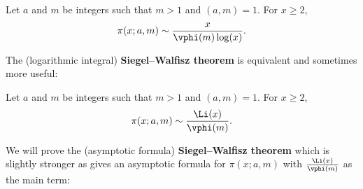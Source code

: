     \begin{theorem*}
      Let \(a\) and \(m\) be integers such that \(m > 1\) and \((a,m) = 1\). For \(x \ge 2\),
      \[
        \pi(x;a,m) \sim \frac{x}{\vphi(m)\log(x)}.
      \]
    \end{theorem*}
    
    The (logarithmic integral) \textbf{Siegel–Walfisz theorem} is equivalent and sometimes more useful:

    \begin{theorem*}
      Let \(a\) and \(m\) be integers such that \(m > 1\) and \((a,m) = 1\). For \(x \ge 2\),
      \[
        \pi(x;a,m) \sim \frac{\Li(x)}{\vphi(m)}.
      \]
    \end{theorem*}
    
    We will prove the (asymptotic formula) \textbf{Siegel–Walfisz theorem} which is slightly stronger as gives an asymptotic formula for \(\pi(x;a,m)\) with \(\frac{\Li(x)}{\vphi(m)}\) as the main term:

